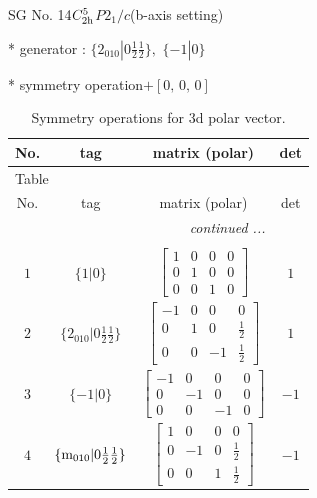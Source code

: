 \documentclass[fleqn,8pt]{jsarticle}
\begin{document}
\setcounter{MaxMatrixCols}{32}

\renewcommand{\tablename}{Table~}
\renewcommand{\figurename}{Figure~}
\begin{center}
\LARGE
SG No. 14\quad$C_{\rm 2h}^{5}$\quad$P2_1/c$\quad(b-axis setting)\quad[ monoclinic ]
\end{center}

* generator : $\{2{}_{010}|0 \frac{1}{2} \frac{1}{2}\},\,\,\{-1|0\}$

* symmetry operation\quad$+\left[ 0,\, 0,\, 0 \right]$
\renewcommand{\arraystretch}{1.3}
\begin{longtable}{cccc}
\caption{Symmetry operations for 3d polar vector.}
 \\
 \hline \hline
No. & tag & matrix (polar) & det \\ \hline \endfirsthead

\multicolumn{3}{l}{\tablename\ \thetable{}} \\
 \hline \hline
No. & tag & matrix (polar) & det \\ \hline \endhead

 \hline \hline
\multicolumn{3}{r}{\footnotesize\it continued ...} \\ \endfoot

 \hline \hline
\multicolumn{3}{r}{} \\ \endlastfoot

$ 1 $ & $ \{1|0\} $ & $ \begin{bmatrix} 1 & 0 & 0 & 0 \\ 0 & 1 & 0 & 0 \\ 0 & 0 & 1 & 0 \end{bmatrix} $ & $ 1 $ \\ \hline
$ 2 $ & $ \{2{}_{010}|0 \frac{1}{2} \frac{1}{2}\} $ & $ \begin{bmatrix} -1 & 0 & 0 & 0 \\ 0 & 1 & 0 & \frac{1}{2} \\ 0 & 0 & -1 & \frac{1}{2} \end{bmatrix} $ & $ 1 $ \\ \hline
$ 3 $ & $ \{-1|0\} $ & $ \begin{bmatrix} -1 & 0 & 0 & 0 \\ 0 & -1 & 0 & 0 \\ 0 & 0 & -1 & 0 \end{bmatrix} $ & $ -1 $ \\ \hline
$ 4 $ & $ \{{\rm m}_{010}|0 \frac{1}{2} \frac{1}{2}\} $ & $ \begin{bmatrix} 1 & 0 & 0 & 0 \\ 0 & -1 & 0 & \frac{1}{2} \\ 0 & 0 & 1 & \frac{1}{2} \end{bmatrix} $ & $ -1 $ \\
\end{longtable}
\end{document}
